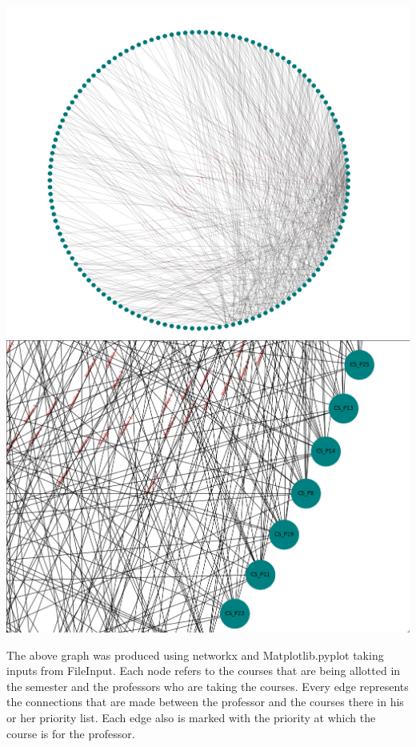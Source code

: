\documentclass[a4paper,12pt]{article}
\begin{document}
\graphicspath{ {./images/} }
   \hspace{1cm}   \includegraphics[scale=1]{Graph1} \\
\includegraphics[scale =0.8]{Graph2}

The above graph was produced using networkx and Matplotlib.pyplot taking inputs from FileInput. Each node refers to the courses that are being allotted in the semester and the professors who are taking the courses. Every edge represents the connections that are made between the professor and the courses there in his or her priority list. Each edge also is marked with the priority at which the course is for the professor. \\ \\
\end{document}
